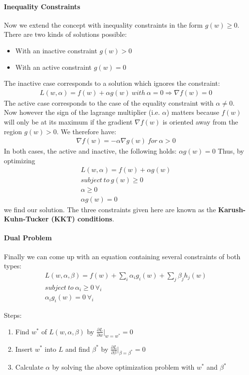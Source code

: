 \documentclass[main]{subfiles}
\begin{document}
\paragraph{Inequality Constraints}
Now we extend the concept with inequality constraints in the form $g(w) \geq 0$. There are two kinds of solutions possible:
\begin{itemize}
	\item With an inactive constraint $g(w) > 0$
	\item With an active constraint $g(w) = 0$
\end{itemize}
The inactive case corresponds to a solution which ignores the constraint:
\begin{align}
L(w,\alpha)=f(w)+\alpha g(w) \ with \ \alpha=0 \Rightarrow \nabla f(w)=0
\end{align}
The active case corresponds to the case of the equality constraint with $\alpha \neq 0$. Now however the sign of the lagrange multiplier (i.e. $\alpha$) matters because $f(w)$ will only be at its maximum if the gradient $\nabla f(w)$ is oriented away from the region $g(w)>0$. We therefore have:
\begin{align}
\nabla f(w)=-\alpha \nabla g(w) \ for \ \alpha > 0
\end{align}
In both cases, the active and inactive, the following holds: $\alpha g(w)=0$ \newline
Thus, by optimizing 
\begin{align}
L(w,\alpha)=f(w)+\alpha g(w) \\
subject \ to \ g(w) \geq 0 \\
\alpha \geq 0 \\
\alpha g(w) = 0
\end{align}
we find our solution. The three constraints given here are known as the \textbf{Karush-Kuhn-Tucker (KKT) conditions}.
\paragraph{Dual Problem}
Finally we can come up with an equation containing several constraints of both types:
\begin{align}
L(w,\alpha,\beta)=f(w)+\sum_i \alpha_i g_i(w)+\sum_j \beta_j h_j(w) \\
subject \ to \ \alpha_i \geq 0 \ \forall_i \\
\alpha_i g_i(w)=0 \ \forall_i
\end{align}

Steps: 
\begin{enumerate}
	\item Find $w^*$ of $L(w, \alpha, \beta)$ by $\frac{\partial L}{\partial w}\rvert_{w=w^*}=0$
	\item Insert $w^*$ into $L$ and find $\beta^*$ by $\frac{\partial L}{\partial \beta}\rvert_{\beta=\beta^*}=0$
	\item Calculate $\alpha$ by solving the above optimization problem with $w^*$ and $\beta^*$
\end{enumerate}
\end{document}
